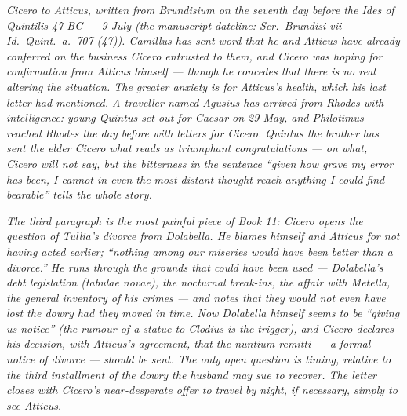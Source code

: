 
\textit{Cicero to Atticus, written from Brundisium on
the seventh day before the Ides of Quintilis 47 BC ---
9 July (the manuscript dateline: \textit{Scr.\ Brundisi
vii Id.\ Quint.\ a.\ 707 (47)}). Camillus has sent
word that he and Atticus have already conferred on
the business Cicero entrusted to them, and Cicero
was hoping for confirmation from Atticus himself ---
though he concedes that there is no real altering the
situation. The greater anxiety is for Atticus's health,
which his last letter had mentioned. A traveller named
Agusius has arrived from Rhodes with intelligence:
young Quintus set out for Caesar on 29 May, and
Philotimus reached Rhodes the day before with letters
for Cicero. Quintus the brother has sent the elder
Cicero what reads as triumphant congratulations ---
on what, Cicero will not say, but the bitterness in
the sentence ``given how grave my error has been, I
cannot in even the most distant thought reach anything
I could find bearable'' tells the whole story.}

\textit{The third paragraph is the most painful piece
of Book 11: Cicero opens the question of Tullia's
divorce from Dolabella. He blames himself and Atticus
for not having acted earlier; ``nothing among our
miseries would have been better than a divorce.''
He runs through the grounds that could have been used
--- Dolabella's debt legislation (\textit{tabulae
novae}), the nocturnal break-ins, the affair with
Metella, the general inventory of his crimes --- and
notes that they would not even have lost the dowry
had they moved in time. Now Dolabella himself seems
to be ``giving us notice'' (the rumour of a statue
to Clodius is the trigger), and Cicero declares his
decision, with Atticus's agreement, that the
\textit{nuntium remitti} --- a formal notice of divorce
--- should be sent. The only open question is timing,
relative to the third installment of the dowry the
husband may sue to recover. The letter closes with
Cicero's near-desperate offer to travel by night,
if necessary, simply to see Atticus.}
